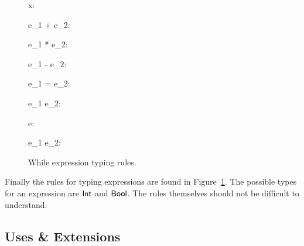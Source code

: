 \begin{figure}[h]
  \begin{multicols}{3}


  \end{multicols}

  \RuleSpace

  {\Gamma \vdash x: \tau}

  \RuleSpace

  {\Gamma \vdash e_1 + e_2: \WhInt}

  \RuleSpace

  {\Gamma \vdash e_1 * e_2: \WhInt}

  \RuleSpace

  {\Gamma \vdash e_1 - e_2: \WhInt}

  \RuleSpace 

  {\Gamma \vdash e_1 = e_2: \WhBool}

  \RuleSpace 

  {\Gamma \vdash e_1 \leq e_2: \WhBool}

  \RuleSpace

  {\Gamma \vdash \lnot e: \WhBool}

  \RuleSpace 

  {\Gamma \vdash e_1 \land e_2: \WhBool}

  \caption{While expression typing rules.}
  \label{fig:while_expr_tpe}
\end{figure}

Finally the rules for typing expressions are found in
Figure~\ref{fig:while_expr_tpe}. The possible types for an expression are
$\mbox{$\mathsf{Int}$}$ and $\mbox{$\mathsf{Bool}$}$. The rules themselves should not be difficult to
understand.


\subsection{Uses \& Extensions}
\label{sub:uses_and_extensions}


